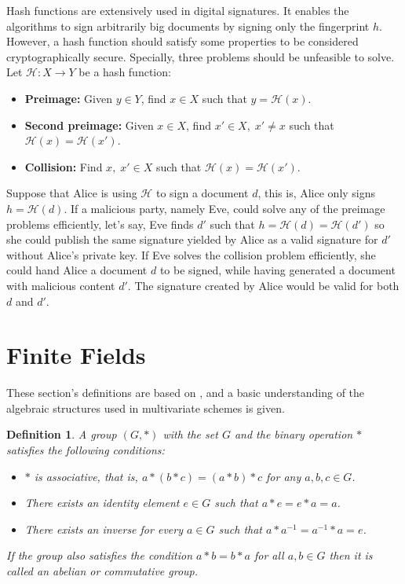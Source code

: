 \documentclass{ufsctex/ufsctex}
\newtheorem{definition}{Definition}
\begin{document}
Hash functions are extensively used in digital signatures. It enables the
algorithms to sign arbitrarily big documents by signing only the fingerprint
$h$. However, a hash function should satisfy some properties to be considered
cryptographically secure. Specially, three problems should be unfeasible to
solve. Let $\mathcal{H}:X \rightarrow Y$ be a hash function:

\begin{itemize}

	\item \textbf{Preimage:} Given $y \in Y$, find $x \in X$ such that $y =
		\mathcal{H}(x)$.

	\item \textbf{Second preimage:} Given $x \in X$, find $x' \in X,\; x' \ne
		x$ such that $\mathcal{H}(x) = \mathcal{H}(x')$.

	\item \textbf{Collision:} Find $x,\; x' \in X$ such that $\mathcal{H}(x) =
		\mathcal{H}(x')$.

\end{itemize}

Suppose that Alice is using $\mathcal{H}$ to sign a document $d$, this is,
Alice only signs $h = \mathcal{H}(d)$. If a malicious party, namely Eve, could
solve any of the preimage problems efficiently, let's say, Eve finds $d'$ such
that $h = \mathcal{H}(d) = \mathcal{H}(d')$ so she could publish the same
signature yielded by Alice as a valid signature for $d'$ without Alice's
private key. If Eve solves the collision problem efficiently, she could hand
Alice a document $d$ to be signed, while having generated a document with
malicious content $d'$. The signature created by Alice would be valid for both
$d$ and $d'$.

\section{Finite Fields}

These section's definitions are based on \cite{lidl1983encyclopedia}, and a
basic understanding of the algebraic structures used in multivariate schemes is
given.

\begin{definition}
A group $(G, *)$ with the set $G$ and the binary operation $*$ satisfies the
following conditions:
\begin{itemize}
	\item $*$ is associative, that is, $a*(b*c) = (a*b)*c$ for any $a, b, c \in
	G$.
	\item There exists an identity element $e \in G$ such that $a * e = e * a =
	a$.
	\item There exists an inverse for every $a \in G$ such that $a*a^{-1} =
	a^{-1}*a = e$.
\end{itemize}
If the group also satisfies the condition $a*b = b*a$ for all $a, b \in G$ then
it is called an abelian or commutative group.
\end{definition}
\end{document}
